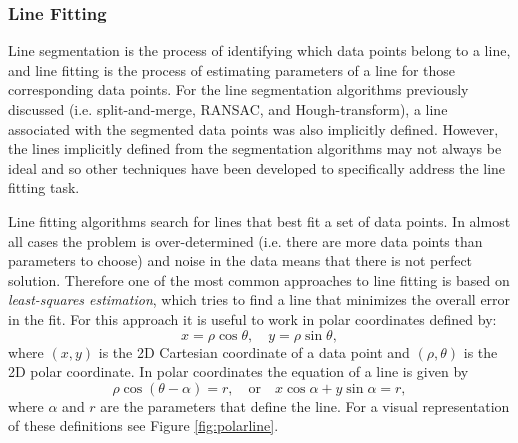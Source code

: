 \subsubsection{Line Fitting}
Line segmentation is the process of identifying which data points belong to a line, and line fitting is the process of estimating parameters of a line for those corresponding data points. For the line segmentation algorithms previously discussed (i.e. split-and-merge, RANSAC, and Hough-transform), a line associated with the segmented data points was also implicitly defined. However, the lines implicitly defined from the segmentation algorithms may not always be ideal and so other techniques have been developed to specifically address the line fitting task.

Line fitting algorithms search for lines that best fit a set of data points. In almost all cases the problem is over-determined (i.e. there are more data points than parameters to choose) and noise in the data means that there is not perfect solution. Therefore one of the most common approaches to line fitting is based on \textit{least-squares estimation}, which tries to find a line that minimizes the overall error in the fit. For this approach it is useful to work in polar coordinates defined by:
\begin{equation*}
    x = \rho \cos \theta, \quad y = \rho \sin \theta,
\end{equation*}
where $(x,y)$ is the 2D Cartesian coordinate of a data point and $(\rho,\theta)$ is the 2D polar coordinate. In polar coordinates the equation of a line is given by
\begin{equation} \label{eq:polarline}
\rho \cos(\theta - \alpha) = r, \quad \text{or} \quad  x \cos \alpha + y \sin \alpha = r,
\end{equation}
where $\alpha$ and $r$ are the parameters that define the line. For a visual representation of these definitions see Figure \ref{fig:polarline}.
